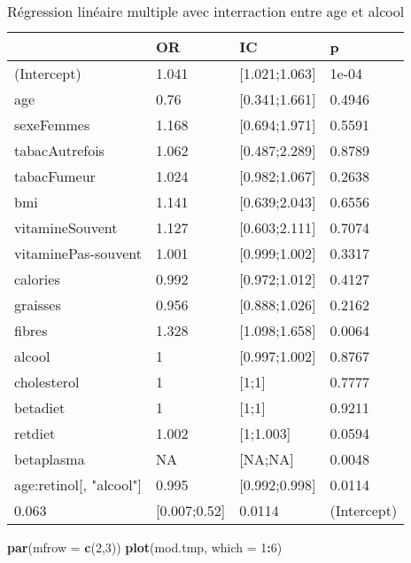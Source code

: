 \documentclass[]{article}
\newenvironment{Shaded}{\begin{snugshade}}{\end{snugshade}}
\newcommand{\KeywordTok}[1]{\textcolor[rgb]{0.13,0.29,0.53}{\textbf{#1}}}
\newcommand{\DataTypeTok}[1]{\textcolor[rgb]{0.13,0.29,0.53}{#1}}
\newcommand{\DecValTok}[1]{\textcolor[rgb]{0.00,0.00,0.81}{#1}}
\newcommand{\OperatorTok}[1]{\textcolor[rgb]{0.81,0.36,0.00}{\textbf{#1}}}
\newcommand{\NormalTok}[1]{#1}
\begin{document}
\begin{table}

\caption{\label{tab:unnamed-chunk-83}Régression linéaire multiple avec interraction entre age et alcool}
\centering
\begin{tabular}[t]{l|l|l|l}
\hline
  & OR & IC & p\\
\hline
\rowcolor[HTML]{BBD2E1}  (Intercept) & 1.041 & [1.021;1.063] & 1e-04\\
\hline
age & 0.76 & [0.341;1.661] & 0.4946\\
\hline
\rowcolor[HTML]{BBD2E1}  sexeFemmes & 1.168 & [0.694;1.971] & 0.5591\\
\hline
tabacAutrefois & 1.062 & [0.487;2.289] & 0.8789\\
\hline
\rowcolor[HTML]{BBD2E1}  tabacFumeur & 1.024 & [0.982;1.067] & 0.2638\\
\hline
bmi & 1.141 & [0.639;2.043] & 0.6556\\
\hline
\rowcolor[HTML]{BBD2E1}  vitamineSouvent & 1.127 & [0.603;2.111] & 0.7074\\
\hline
vitaminePas-souvent & 1.001 & [0.999;1.002] & 0.3317\\
\hline
\rowcolor[HTML]{BBD2E1}  calories & 0.992 & [0.972;1.012] & 0.4127\\
\hline
graisses & 0.956 & [0.888;1.026] & 0.2162\\
\hline
\rowcolor[HTML]{BBD2E1}  fibres & 1.328 & [1.098;1.658] & 0.0064\\
\hline
alcool & 1 & [0.997;1.002] & 0.8767\\
\hline
\rowcolor[HTML]{BBD2E1}  cholesterol & 1 & [1;1] & 0.7777\\
\hline
betadiet & 1 & [1;1] & 0.9211\\
\hline
\rowcolor[HTML]{BBD2E1}  retdiet & 1.002 & [1;1.003] & 0.0594\\
\hline
betaplasma & NA & [NA;NA] & 0.0048\\
\hline
\rowcolor[HTML]{BBD2E1}  age:retinol[, "alcool"] & 0.995 & [0.992;0.998] & 0.0114\\
\hline
0.063 & [0.007;0.52] & 0.0114 & (Intercept)\\
\hline
\end{tabular}
\end{table}

\begin{Shaded}
\begin{Highlighting}[]
\KeywordTok{par}\NormalTok{(}\DataTypeTok{mfrow =} \KeywordTok{c}\NormalTok{(}\DecValTok{2}\NormalTok{,}\DecValTok{3}\NormalTok{))}
\KeywordTok{plot}\NormalTok{(mod.tmp, }\DataTypeTok{which =} \DecValTok{1}\OperatorTok{:}\DecValTok{6}\NormalTok{)}
\end{Highlighting}
\end{Shaded}
\end{document}

